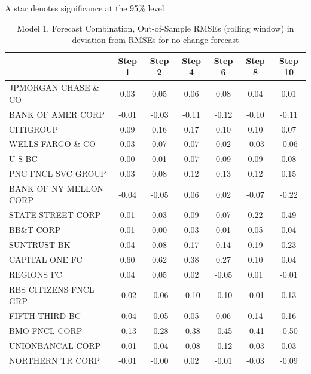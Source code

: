 \documentclass[11pt]{article}
\begin{document}
\begin{table}
\flushleft
\footnotesize \noindent A star denotes significance at the 95\% level                                                      
\end{table}                                                         




\begin{table}
\caption{Model 1, Forecast Combination, Out-of-Sample RMSEs (rolling window) in deviation from RMSEs for no-change forecast}                                               
\center                                                     
\begin{tabular}{|l|c|c|c|c|c|c|}                            
\hline                                                      
&Step 1 &Step 2 &Step 4 &Step 6 &Step 8 &Step 10\\          
\hline                                                      
JPMORGAN CHASE \& CO  &0.03&0.05&0.06&0.08&0.04&0.01\\      
BANK OF AMER CORP     &-0.01&-0.03&-0.11&-0.12&-0.10&-0.11\\
CITIGROUP             &0.09&0.16&0.17&0.10&0.10&0.07\\      
WELLS FARGO \& CO     &0.03&0.07&0.07&0.02&-0.03&-0.06\\    
U S BC                &0.00&0.01&0.07&0.09&0.09&0.08\\      
PNC FNCL SVC GROUP    &0.03&0.08&0.12&0.13&0.12&0.15\\      
BANK OF NY MELLON CORP&-0.04&-0.05&0.06&0.02&-0.07&-0.22\\  
STATE STREET CORP     &0.01&0.03&0.09&0.07&0.22&0.49\\      
BB\&T CORP            &0.01&0.00&0.03&0.01&0.05&0.04\\      
SUNTRUST BK           &0.04&0.08&0.17&0.14&0.19&0.23\\      
CAPITAL ONE FC        &0.60&0.62&0.38&0.27&0.10&0.04\\      
REGIONS FC            &0.04&0.05&0.02&-0.05&0.01&-0.01\\    
RBS CITIZENS FNCL GRP &-0.02&-0.06&-0.10&-0.10&-0.01&0.13\\ 
FIFTH THIRD BC        &-0.04&-0.05&0.05&0.06&0.14&0.16\\    
BMO FNCL CORP         &-0.13&-0.28&-0.38&-0.45&-0.41&-0.50\\
UNIONBANCAL CORP      &-0.01&-0.04&-0.08&-0.12&-0.03&0.03\\ 
NORTHERN TR CORP      &-0.01&-0.00&0.02&-0.01&-0.03&-0.09\\ 

\end{tabular}
\end{table}
\end{document}
